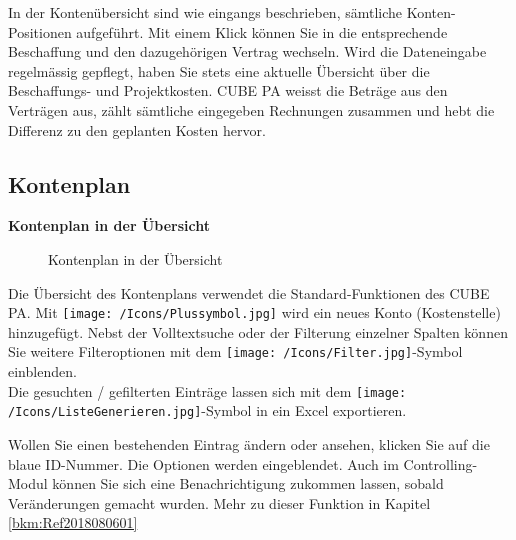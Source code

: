 In der Kontenübersicht sind wie eingangs beschrieben, sämtliche Konten-Positionen aufgeführt. Mit einem Klick können Sie in die entsprechende Beschaffung und den dazugehörigen Vertrag wechseln. Wird die Dateneingabe regelmässig gepflegt, haben Sie stets eine aktuelle Übersicht über die Beschaffungs- und Projektkosten. CUBE PA weisst die Beträge aus den Verträgen aus, zählt sämtliche eingegeben Rechnungen zusammen und hebt die Differenz zu den geplanten Kosten hervor.

\pagebreak
\subsection{Kontenplan}

\textbf{Kontenplan in der Übersicht}

\begin{figure}[H]
\caption{Kontenplan in der Übersicht}
\end{figure}

Die Übersicht des Kontenplans verwendet die Standard-Funktionen des CUBE PA. Mit \texttt{[image: /Icons/Plussymbol.jpg]} wird ein neues Konto (Kostenstelle) hinzugefügt. Nebst der Volltextsuche oder der Filterung einzelner Spalten können Sie weitere Filteroptionen mit dem \texttt{[image: /Icons/Filter.jpg]}-Symbol einblenden.\\
Die gesuchten / gefilterten Einträge lassen sich mit dem \texttt{[image: /Icons/ListeGenerieren.jpg]}-Symbol in ein Excel exportieren.

\vspace{\baselineskip}

Wollen Sie einen bestehenden Eintrag ändern oder ansehen, klicken Sie auf die blaue ID-Nummer. Die Optionen werden eingeblendet. Auch im Controlling-Modul können Sie sich eine Benachrichtigung zukommen lassen, sobald Veränderungen gemacht wurden. Mehr zu dieser Funktion in Kapitel \ref{bkm:Ref2018080601}

